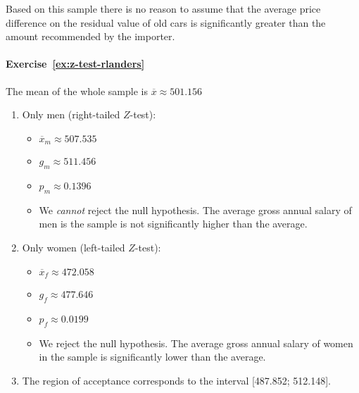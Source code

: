 Based on this sample there is no reason to assume that the average price difference on the residual value of old cars is significantly greater than the amount recommended by the importer.

\paragraph{Exercise~\ref{ex:z-test-rlanders}}

The mean of the whole sample is $\overline{x} \approx 501.156$

\begin{enumerate}
  \item Only men (right-tailed $Z$-test):
    \begin{itemize}
      \item $\overline{x}_m \approx 507.535$
      \item $g_m \approx 511.456$
      \item $p_m \approx 0.1396$
      \item We \textit{cannot} reject the null hypothesis. The average gross annual salary of men is the sample is not significantly higher than the average.
    \end{itemize}
  \item Only women (left-tailed $Z$-test):
    \begin{itemize}
      \item $\overline{x}_f \approx 472.058$
      \item $g_f \approx 477.646$
      \item $p_f \approx 0.0199$
      \item We  reject the null hypothesis. The average gross annual salary of women in the sample is significantly lower than the average.
    \end{itemize}
  \item The region of acceptance corresponds to the interval [487.852; 512.148].
\end{enumerate}
